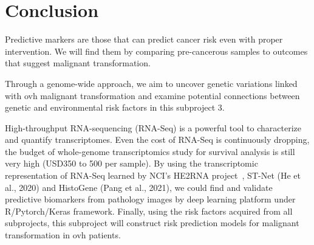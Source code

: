 \documentclass[12pt, a4paper]{article}
\begin{document}
\section{Conclusion}

Predictive markers are those that can predict cancer risk even with proper intervention. We will find them by comparing pre-cancerous samples to outcomes that suggest malignant transformation. 

Through a genome-wide approach, we aim to uncover genetic variations linked with \acrshort{ovh} malignant transformation and examine potential connections between genetic and environmental risk factors in this subproject 3.

High-throughput RNA-sequencing (RNA-Seq) is a powerful tool to characterize and quantify transcriptomes. Even the cost of RNA-Seq is continuously dropping, 
the budget of whole-genome transcriptomics study for survival analysis is still very high (USD350 to 500 per sample). %
By using the transcriptomic representation of RNA-Seq learned by NCI's HE2RNA project~\citep{Schmauch2020}, ST-Net (He et al., 2020) and HistoGene (Pang et al., 2021),
we could find and validate predictive biomarkers from pathology images by deep learning platform under R/Pytorch/Keras framework.
Finally, using the risk factors acquired from all subprojects, this subproject will construct risk prediction models for malignant transformation in \acrshort{ovh} patients.\\[2.5cm]
\end{document}
